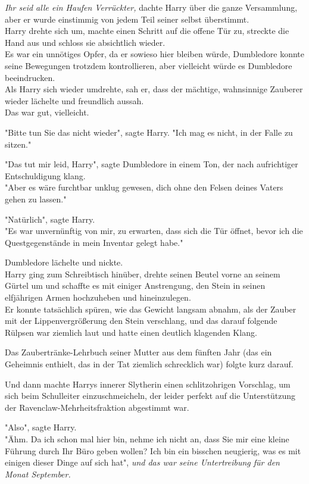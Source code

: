 {\emph{Ihr seid alle ein Haufen Verrückter,} dachte Harry über die ganze Versammlung, aber er wurde einstimmig von jedem Teil seiner selbst überstimmt.\\ Harry drehte sich um, machte einen Schritt auf die offene Tür zu, streckte die Hand aus und schloss sie absichtlich wieder.\\ Es war ein unnötiges Opfer, da er sowieso hier bleiben würde, Dumbledore konnte seine Bewegungen trotzdem kontrollieren, aber vielleicht würde es Dumbledore beeindrucken.\\ Als Harry sich wieder umdrehte, sah er, dass der mächtige, wahnsinnige Zauberer wieder lächelte und freundlich aussah.\\ Das war gut, vielleicht.

"Bitte tun Sie das nicht wieder", sagte Harry. "Ich mag es nicht, in der Falle zu sitzen."

"Das tut mir leid, Harry", sagte Dumbledore in einem Ton, der nach aufrichtiger Entschuldigung klang.\\ "Aber es wäre furchtbar unklug gewesen, dich ohne den Felsen deines Vaters gehen zu lassen."

"Natürlich", sagte Harry.\\ "Es war unvernünftig von mir, zu erwarten, dass sich die Tür öffnet, bevor ich die Questgegenstände in mein Inventar gelegt habe."

Dumbledore lächelte und nickte.\\ Harry ging zum Schreibtisch hinüber, drehte seinen Beutel vorne an seinem Gürtel um und schaffte es mit einiger Anstrengung, den Stein in seinen elfjährigen Armen hochzuheben und hineinzulegen.\\ Er konnte tatsächlich spüren, wie das Gewicht langsam abnahm, als der Zauber mit der Lippenvergrößerung den Stein verschlang, und das darauf folgende Rülpsen war ziemlich laut und hatte einen deutlich klagenden Klang.

Das Zaubertränke-Lehrbuch seiner Mutter aus dem fünften Jahr (das ein Geheimnis enthielt, das in der Tat ziemlich schrecklich war) folgte kurz darauf.

Und dann machte Harrys innerer Slytherin einen schlitzohrigen Vorschlag, um sich beim Schulleiter einzuschmeicheln, der leider perfekt auf die Unterstützung der Ravenclaw-Mehrheitsfraktion abgestimmt war.

"Also", sagte Harry.\\ "Ähm. Da ich schon mal hier bin, nehme ich nicht an, dass Sie mir eine kleine Führung durch Ihr Büro geben wollen? Ich bin ein bisschen neugierig, was es mit einigen dieser Dinge auf sich hat", \emph{und das war seine Untertreibung für den Monat September.}

}
